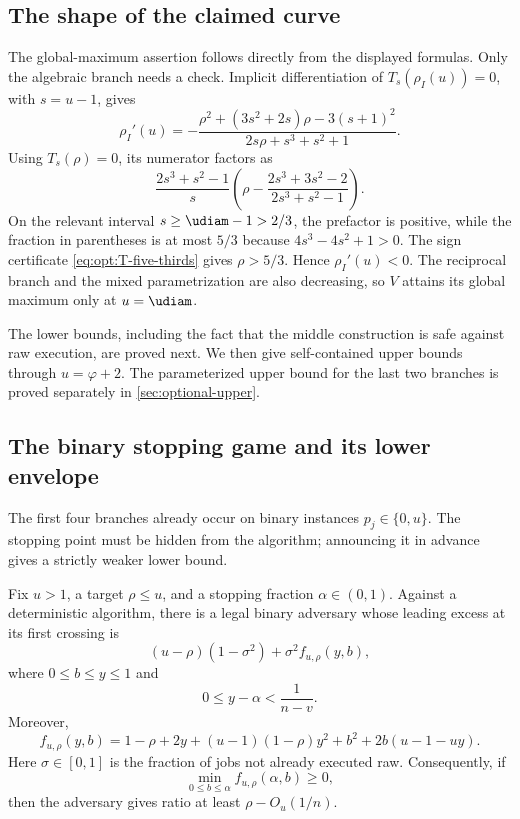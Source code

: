 \subsection{The shape of the claimed curve}

The global-maximum assertion follows directly from the displayed formulas.
Only the algebraic branch needs a check.  Implicit differentiation of
$T_s(\rho_I(u))=0$, with $s=u-1$, gives
\begin{equation}
 \rho_I'(u)=
 -\frac{\rho^2+(3s^2+2s)\rho-3(s+1)^2}
 {2s\rho+s^3+s^2+1}.
 \label{eq:opt:rhoI-derivative}
\end{equation}
Using $T_s(\rho)=0$, its numerator factors as
\[
 \frac{2s^3+s^2-1}{s}
 \left(\rho-
 \frac{2s^3+3s^2-2}{2s^3+s^2-1}\right).
\]
On the relevant interval $s\ge \udiam-1>2/3$, the prefactor is
positive, while the fraction in parentheses is at most $5/3$ because
$4s^3-4s^2+1>0$.  The sign certificate
\eqref{eq:opt:T-five-thirds} gives $\rho>5/3$.  Hence
$\rho_I'(u)<0$.  The reciprocal branch and the mixed parametrization are
also decreasing, so $V$ attains its global maximum only at
$u=\udiam$.

The lower bounds, including the fact that the middle construction is safe
against raw execution, are proved next.  We then give self-contained upper
bounds through $u=\varphi+2$.  The parameterized upper bound for the last two
branches is proved separately in \cref{sec:optional-upper}.

\subsection{The binary stopping game and its lower envelope}
\label{sec:optional-lower}

The first four branches already occur on binary instances
$p_j\in\{0,u\}$.  The stopping point must be hidden from the algorithm;
announcing it in advance gives a strictly weaker lower bound.

\begin{lemma}
\label{lem:opt:hidden-stopping}
Fix $u>1$, a target $\rho\le u$, and a stopping fraction $\alpha\in(0,1)$.
Against a deterministic algorithm, there is a legal binary adversary whose
leading excess at its first crossing is
\begin{equation}
 (u-\rho)(1-\sigma^2)+\sigma^2 f_{u,\rho}(y,b),
 \label{eq:opt:stopping-decomposition}
\end{equation}
where $0\le b\le y\le1$ and
\begin{equation}
 0\le y-\alpha<\frac1{n-v}.
 \label{eq:opt:stopping-overshoot}
\end{equation}
Moreover,
\begin{equation}
 f_{u,\rho}(y,b)=
 1-\rho+2y+(u-1)(1-\rho)y^2
 +b^2+2b(u-1-uy).
 \label{eq:opt:stopping-f}
\end{equation}
Here $\sigma\in[0,1]$ is the fraction of jobs not already executed raw.
Consequently, if
\[
 \min_{0\le b\le\alpha}f_{u,\rho}(\alpha,b)\ge0,
\]
then the adversary gives ratio at least $\rho-O_u(1/n)$.
\end{lemma}

